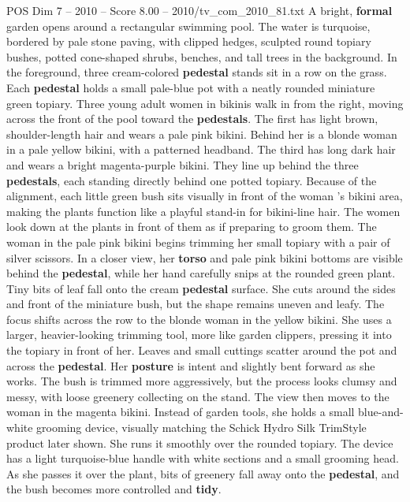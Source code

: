 \begin{textsample}{POS Dim 7 – 2010 – Score 8.00 – 2010/tv\_com\_2010\_81.txt}  \label{ex:f7_pos_052}
A bright, \textbf{formal} garden opens around a rectangular swimming pool.
The water is turquoise, bordered by pale stone paving, with clipped hedges, sculpted round topiary bushes, potted cone-shaped shrubs, benches, and tall trees in the background.
In the foreground, three cream-colored \textbf{pedestal} stands sit in a row on the grass.
Each \textbf{pedestal} holds a small pale-blue pot with a neatly rounded miniature green topiary.
Three young adult women in bikinis walk in from the right, moving across the front of the pool toward the \textbf{pedestals}.
The first has light brown, shoulder-length hair and wears a pale pink bikini.
Behind her is a blonde woman in a pale yellow bikini, with a patterned headband.
The third has long dark hair and wears a bright magenta-purple bikini.
They line up behind the three \textbf{pedestals}, each standing directly behind one potted topiary.
Because of the alignment, each little green bush sits visually in front of the woman ’s bikini area, making the plants function like a playful stand-in for bikini-line hair.
The women look down at the plants in front of them as if preparing to groom them.
The woman in the pale pink bikini begins trimming her small topiary with a pair of silver scissors.
In a closer view, her \textbf{torso} and pale pink bikini bottoms are visible behind the \textbf{pedestal}, while her hand carefully snips at the rounded green plant.
Tiny bits of leaf fall onto the cream \textbf{pedestal} surface.
She cuts around the sides and front of the miniature bush, but the shape remains uneven and leafy.
The focus shifts across the row to the blonde woman in the yellow bikini.
She uses a larger, heavier-looking trimming tool, more like garden clippers, pressing it into the topiary in front of her.
Leaves and small cuttings scatter around the pot and across the \textbf{pedestal}.
Her \textbf{posture} is intent and slightly bent forward as she works.
The bush is trimmed more aggressively, but the process looks clumsy and messy, with loose greenery collecting on the stand.
The view then moves to the woman in the magenta bikini.
Instead of garden tools, she holds a small blue-and-white grooming device, visually matching the Schick Hydro Silk TrimStyle product later shown.
She runs it smoothly over the rounded topiary.
The device has a light turquoise-blue handle with white sections and a small grooming head.
As she passes it over the plant, bits of greenery fall away onto the \textbf{pedestal}, and the bush becomes more controlled and \textbf{tidy}.

\end{textsample}
